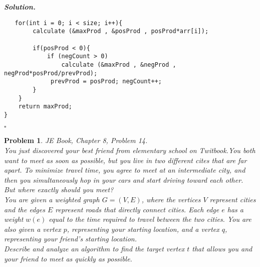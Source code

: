 \documentclass[12pt]{article}
\newtheorem{problem}{Problem}
\newenvironment{solution}[1][\it{Solution}]{\textbf{#1. } }{$\square$}
\begin{document}
\begin{solution}
\begin{verbatim}
   for(int i = 0; i < size; i++){
        calculate (&maxProd , &posProd , posProd*arr[i]);
        
        if(posProd < 0){
            if (negCount > 0)
                calculate (&maxProd , &negProd , negProd*posProd/prevProd);
             prevProd = posProd; negCount++;
        }
    }
    return maxProd;
}
\end{verbatim}

\end{solution} 

\hrulefill %

\begin{problem}
 JE Book, Chapter 8, Problem 14. \\
 \indent You just discovered your best friend from elementary school on Twitbook.You both want to meet as soon as possible, but you live in two different cites that are far apart. To minimize travel time, you agree to meet at an intermediate city, and then you simultaneously hop in your cars and start driving toward each other. But where exactly should you meet?
\\ \indent You are given a weighted graph $G = (V, E)$, where the vertices $V$ represent cities and the edges $E$ represent roads that directly connect cities. Each edge $e$ has a weight $w(e)$ equal to the time required to travel between the two cities. You are also given a vertex $p$, representing your starting location, and a vertex $q$, representing your friend’s starting location.
\\ \indent Describe and analyze an algorithm to find the target vertex $t$ that allows
you and your friend to meet as quickly as possible.
\end{problem}

\end{document}
